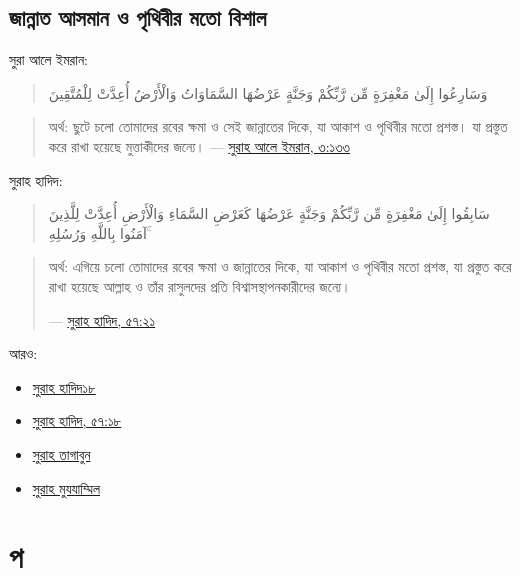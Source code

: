 \documentclass[
]{book}
\providecommand{\tightlist}{%
  \setlength{\itemsep}{0pt}\setlength{\parskip}{0pt}}
\begin{document}
\hypertarget{zannah-size}{%
\subsection*{জান্নাত আসমান ও পৃথিবীর মতো বিশাল}\label{zannah-size}}

সুরা আলে ইমরান:

\begin{quote}
وَسَارِعُوا إِلَىٰ مَغْفِرَةٍ مِّن رَّبِّكُمْ وَجَنَّةٍ عَرْضُهَا السَّمَاوَاتُ وَالْأَرْضُ أُعِدَّتْ لِلْمُتَّقِينَ
\end{quote}

\begin{quote}
অর্থ: ছুটে চলো তোমাদের রবের ক্ষমা ও সেই জান্নাতের দিকে, যা আকাশ ও পৃথিবীর মতো প্রশস্ত। যা প্রস্তুত করে রাখা হয়েছে মুত্তাকীদের জন্যে।
--- \href{https://tanzil.net/\#3:133}{সুরাহ আলে ইমরান, ৩:১৩৩}
\end{quote}

সুরাহ হাদিদ:

\begin{quote}
سَابِقُوا إِلَىٰ مَغْفِرَةٍ مِّن رَّبِّكُمْ وَجَنَّةٍ عَرْضُهَا كَعَرْضِ السَّمَاءِ وَالْأَرْضِ أُعِدَّتْ لِلَّذِينَ آمَنُوا بِاللَّهِ وَرُسُلِهِ ۚ
\end{quote}

\begin{quote}
অর্থ: এগিয়ে চলো তোমাদের রবের ক্ষমা ও জান্নাতের দিকে, যা আকাশ ও পৃথিবীর মতো প্রশস্ত, যা প্রস্তুত করে রাখা হয়েছে আল্লাহ ও তাঁর রাসুলদের প্রতি বিশ্বাসস্থাপনকারীদের জন্যে।

--- \href{https://tanzil.net/\#57:21}{সুরাহ হাদিদ, ৫৭:২১}
\end{quote}

আরও:

\begin{itemize}
\tightlist
\item
  \href{https://tanzil.net/\#57:11}{সুরাহ হাদিদ১৮}
\item
  \href{https://tanzil.net/\#57:18}{সুরাহ হাদিদ, ৫৭:১৮}
\item
  \href{https://tanzil.net/\#64:17}{সুরাহ তাগাবুন}
\item
  \href{https://tanzil.net/\#73:20}{সুরাহ মুযযাম্মিল}
\end{itemize}

\hypertarget{p}{%
\section*{প}\label{p}}
\end{document}
